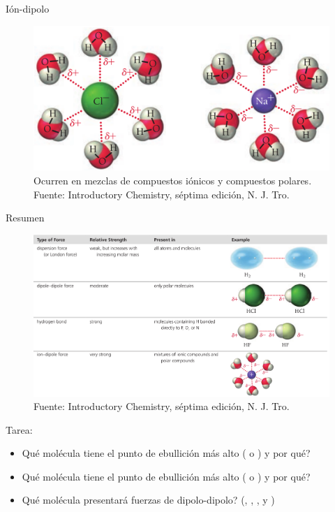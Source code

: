 \documentclass{beamer}
\begin{document}
\begin{frame}{Ión-dipolo}
  \begin{figure}
    \centering
    \includegraphics[width=0.7\linewidth]{imgs/ion-dipole}
    \caption{Ocurren en mezclas de compuestos iónicos y compuestos polares. Fuente: Introductory Chemistry, séptima edición, N. J. Tro.}
    \label{fig:ion-dipole}
  \end{figure}
\end{frame}
\begin{frame}{Resumen}
  \begin{figure}
    \centering
    \includegraphics[width=0.95\linewidth]{imgs/summary}
    \caption{Fuente: Introductory Chemistry, séptima edición, N. J. Tro.}
    \label{fig:resumen}
  \end{figure}
\end{frame}
\begin{frame}{Tarea:}
  \begin{itemize}
    \item Qué molécula tiene el punto de ebullición más alto ( o ) y por qué?
    \item Qué molécula tiene el punto de ebullición más alto ( o ) y por qué?
    \item Qué molécula presentará fuerzas de dipolo-dipolo? (, , ,  y )
  \end{itemize}
\end{frame}
\end{document}

